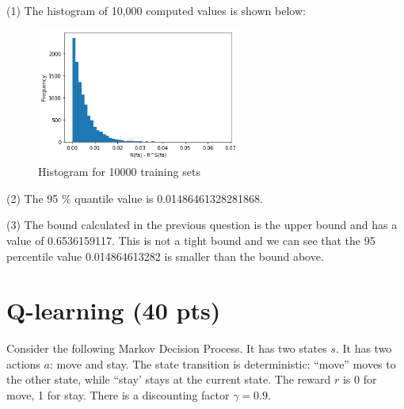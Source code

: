 \documentclass[a4paper]{article}
\theoremstyle{definition}
\newenvironment{soln}{
    \leavevmode\color{blue}\ignorespaces
}{}
\begin{document}
\begin{enumerate}
\begin{soln}
\\(1) The histogram of 10,000 computed values is shown below:

\begin{figure}[h!]
	        \centering
	        \includegraphics[width=0.6\textwidth]{Histogram.png} 
	        \captionsetup{labelformat=empty}
	        \caption{Histogram for 10000 training sets}
	        \label{fig: Histogram for 10000 training sets}
\end{figure}

(2) The 95 \% quantile value is 0.01486461328281868.

(3) The bound calculated in the previous question is the upper bound and has a value of 0.6536159117. This is not a tight bound and we can see that the 95 percentile value 0.014864613282 is smaller than the bound above. 

\end{soln}

\end{enumerate}


\section{Q-learning (40 pts)}
Consider the following Markov Decision Process.
It has two states $s$.
It has two actions $a$: move and stay.
The state transition is deterministic: ``move'' moves to the other state, while ``stay' stays at the current state.
The reward $r$ is 0 for move,  1 for stay. 
There is a discounting factor $\gamma=0.9$.
\\
\end{document}
